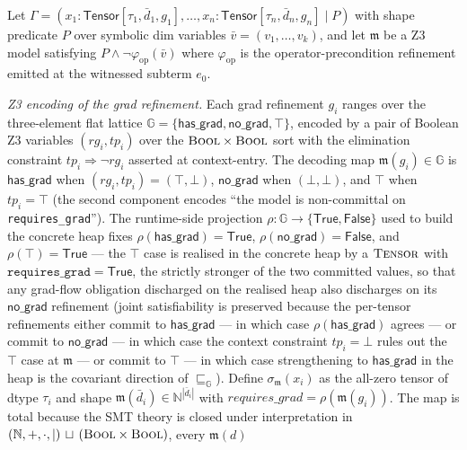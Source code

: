 \begin{definition}
\label{def:model-extraction}
Let $\Gamma=(x_1{:}\mathsf{Tensor}[\tau_1,\bar d_1,g_1],
\dots,x_n{:}\mathsf{Tensor}[\tau_n,\bar d_n,g_n]\mid P)$ with
shape predicate $P$ over symbolic dim variables
$\bar v=(v_1,\dots,v_k)$, and let $\mathfrak{m}$ be a Z3 model
satisfying $P\wedge\neg\varphi_{\mathrm{op}}(\bar v)$ where
$\varphi_{\mathrm{op}}$ is the operator-precondition refinement
emitted at the witnessed subterm $e_0$.

\emph{Z3 encoding of the grad refinement.} Each grad refinement
$g_i$ ranges over the three-element flat lattice
$\mathbb{G}=\{\mathsf{has\_grad},\mathsf{no\_grad},\top\}$,
encoded by a pair of Boolean Z3 variables
$(\mathit{rg}_i,\mathit{tp}_i)$ over the
$\textsc{Bool}\times\textsc{Bool}$ sort with the elimination
constraint $\mathit{tp}_i\Rightarrow\neg\mathit{rg}_i$
asserted at context-entry. The decoding map
$\mathfrak{m}(g_i)\in\mathbb{G}$ is
$\mathsf{has\_grad}$ when
$(\mathit{rg}_i,\mathit{tp}_i)=(\top,\bot)$,
$\mathsf{no\_grad}$ when
$(\bot,\bot)$, and $\top$ when
$\mathit{tp}_i=\top$ (the second component encodes
``the model is non-committal on \texttt{requires\_grad}'').
The runtime-side projection
$\rho:\mathbb{G}\to\{\mathsf{True},\mathsf{False}\}$ used to
build the concrete heap fixes
$\rho(\mathsf{has\_grad})=\mathsf{True}$,
$\rho(\mathsf{no\_grad})=\mathsf{False}$, and
$\rho(\top)=\mathsf{True}$ — the $\top$ case is realised in
the concrete heap by a $\textsc{Tensor}$ with
$\texttt{requires\_grad}=\mathsf{True}$, the strictly stronger
of the two committed values, so that any grad-flow obligation
discharged on the realised heap also discharges on its
$\mathsf{no\_grad}$ refinement (joint satisfiability is
preserved because the per-tensor refinements either commit to
$\mathsf{has\_grad}$ — in which case $\rho(\mathsf{has\_grad})$
agrees — or commit to $\mathsf{no\_grad}$ — in which case the
context constraint $\mathit{tp}_i=\bot$ rules out the $\top$
case at $\mathfrak{m}$ — or commit to $\top$ — in which case
strengthening to $\mathsf{has\_grad}$ in the heap is the
covariant direction of $\sqsubseteq_{\mathbb{G}}$).
Define $\sigma_{\mathfrak{m}}(x_i)$ as the all-zero tensor of
dtype $\tau_i$ and shape
$\mathfrak{m}(\bar d_i)\in\mathbb{N}^{|\bar d_i|}$ with
$\mathit{requires\_grad}=\rho(\mathfrak{m}(g_i))$.
The map is total because the SMT theory is closed under
interpretation in $(\mathbb{N},+,\cdot,\mid)\,\sqcup\,
(\textsc{Bool}\times\textsc{Bool})$, every $\mathfrak{m}(d)$

\end{definition}
